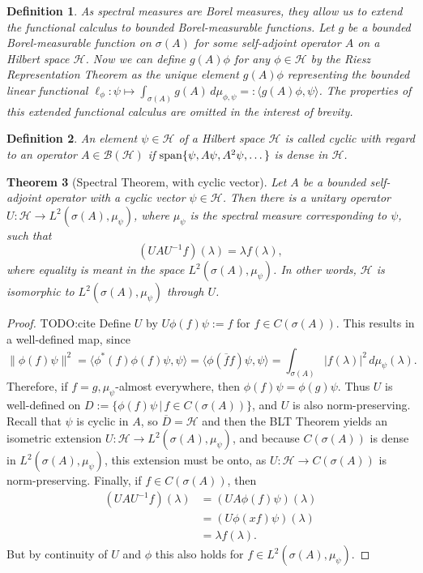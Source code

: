\documentclass[12pt,oneside]{report}
\newtheorem{thm}{Theorem}[chapter]
\newtheorem{defn}[thm]{Definition}
\begin{document}
\begin{defn}\label{measurable-func-calc}
    As spectral measures are Borel measures, they allow us to extend the functional calculus to bounded Borel-measurable functions. Let $g$ be a bounded Borel-measurable function on $\sigma(A)$ for some self-adjoint operator $A$ on a Hilbert space $\mathscr{H}$. Now we can define $g(A)\phi$ for any $\phi \in \mathscr{H}$ by the Riesz Representation Theorem as the unique element $g(A)\phi$ representing the bounded linear functional $\ell_\phi: \psi \mapsto \int_{\sigma(A)} g(A) \, d\mu_{\phi,\psi} =: \langle g(A)\phi, \psi \rangle$. The properties of this extended functional calculus are omitted in the interest of brevity.
\end{defn}

\begin{defn}
    An element $\psi \in \mathscr{H}$ of a Hilbert space $\mathscr{H}$ is called cyclic with regard to an operator $A \in \mathscr{B}(\mathscr{H})$ if $\mathrm{span}\{ \psi, A\psi, A^{2}\psi, \dots \}$ is dense in $\mathscr{H}$.
\end{defn}

\begin{thm}[Spectral Theorem, with cyclic vector]\label{spectral-mo}
    Let $A$ be a bounded self-adjoint operator with a cyclic vector $\psi \in \mathscr{H}$. Then there is a unitary operator $U: \mathscr{H} \to L^{2}(\sigma(A),\mu_{\psi})$, where $\mu_{\psi}$ is the spectral measure corresponding to $\psi$, such that $$(UAU^{-1}f)(\lambda) = \lambda f(\lambda),$$where equality is meant in the space $L^{2}(\sigma(A),\mu_{\psi})$. In other words, $\mathscr{H}$ is isomorphic to $L^2(\sigma(A),\mu_\psi)$ through $U$.
\end{thm}
\begin{proof}
    TODO:cite Define $U$ by $U\phi(f)\psi := f$ for $f \in C(\sigma(A))$. This results in a well-defined map, since $$\|\phi(f)\psi\|^{2} = \langle \phi^{*}(f)\phi(f)\psi, \psi \rangle = \langle \phi(\overline{f}f)\psi, \psi \rangle = \int _{\sigma(A)} |f(\lambda)|^{2} \, d\mu_{\psi}(\lambda).$$ Therefore, if $f=g, \mu_{\psi}$-almost everywhere, then $\phi(f)\psi = \phi(g)\psi$. Thus $U$ is well-defined on $D := \{ \phi(f)\psi \, | \, f \in C(\sigma(A)) \}$, and $U$ is also norm-preserving. Recall that $\psi$ is cyclic in $A$, so $\overline{D} = \mathscr{H}$ and then the BLT Theorem yields an isometric extension $U: \mathscr{H} \to L^{2}(\sigma(A), \mu_{\psi})$, and because $C(\sigma(A))$ is dense in $L^{2}(\sigma(A),\mu_{\psi})$, this extension must be onto, as $U: \mathscr{H} \to C(\sigma(A))$ is norm-preserving. Finally, if $f \in C(\sigma(A))$, then \begin{align*}
        (UAU^{-1}f)(\lambda) &= (UA\phi(f)\psi)(\lambda) \\
        &= (U\phi(xf)\psi)(\lambda) \\
        &= \lambda f(\lambda).
    \end{align*} But by continuity of $U$ and $\phi$ this also holds for $f \in L^{2}(\sigma(A),\mu_{\psi})$.
\end{proof}
\end{document}
